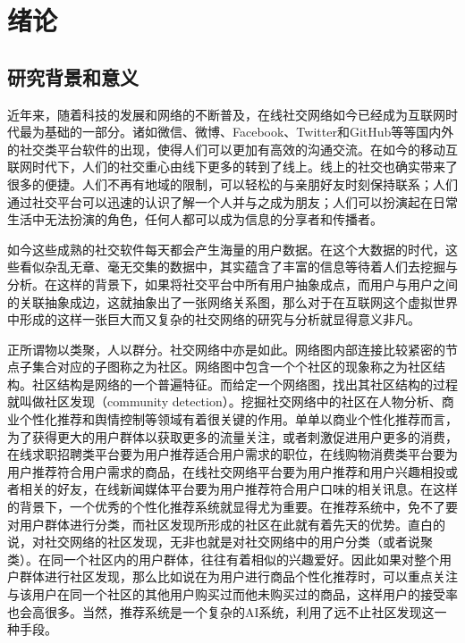 \chapter{绪论}
\section{研究背景和意义}

近年来，随着科技的发展和网络的不断普及，在线社交网络如今已经成为互联网时代最为基础的一部分。诸如微信、微博、Facebook、Twitter和GitHub等等国内外的社交类平台软件的出现，使得人们可以更加有高效的沟通交流。在如今的移动互联网时代下，人们的社交重心由线下更多的转到了线上。线上的社交也确实带来了很多的便捷。人们不再有地域的限制，可以轻松的与亲朋好友时刻保持联系；人们通过社交平台可以迅速的认识了解一个人并与之成为朋友；人们可以扮演起在日常生活中无法扮演的角色，任何人都可以成为信息的分享者和传播者。

如今这些成熟的社交软件每天都会产生海量的用户数据。在这个大数据的时代，这些看似杂乱无章、毫无交集的数据中，其实蕴含了丰富的信息等待着人们去挖掘与分析。在这样的背景下，如果将社交平台中所有用户抽象成点，而用户与用户之间的关联抽象成边，这就抽象出了一张网络关系图，那么对于在互联网这个虚拟世界中形成的这样一张巨大而又复杂的社交网络的研究与分析就显得意义非凡。

正所谓物以类聚，人以群分。社交网络中亦是如此。网络图内部连接比较紧密的节点子集合对应的子图称之为社区。网络图中包含一个个社区的现象称之为社区结构。社区结构是网络的一个普遍特征。而给定一个网络图，找出其社区结构的过程就叫做社区发现（community detection）。挖掘社交网络中的社区在人物分析、商业个性化推荐和舆情控制等领域有着很关键的作用。单单以商业个性化推荐而言，为了获得更大的用户群体以获取更多的流量关注，或者刺激促进用户更多的消费，在线求职招聘类平台要为用户推荐适合用户需求的职位，在线购物消费类平台要为用户推荐符合用户需求的商品，在线社交网络平台要为用户推荐和用户兴趣相投或者相关的好友，在线新闻媒体平台要为用户推荐符合用户口味的相关讯息。在这样的背景下，一个优秀的个性化推荐系统就显得尤为重要。在推荐系统中，免不了要对用户群体进行分类，而社区发现所形成的社区在此就有着先天的优势。直白的说，对社交网络的社区发现，无非也就是对社交网络中的用户分类（或者说聚类）。在同一个社区内的用户群体，往往有着相似的兴趣爱好。因此如果对整个用户群体进行社区发现，那么比如说在为用户进行商品个性化推荐时，可以重点关注与该用户在同一个社区的其他用户购买过而他未购买过的商品，这样用户的接受率也会高很多。当然，推荐系统是一个复杂的AI系统，利用了远不止社区发现这一种手段。


